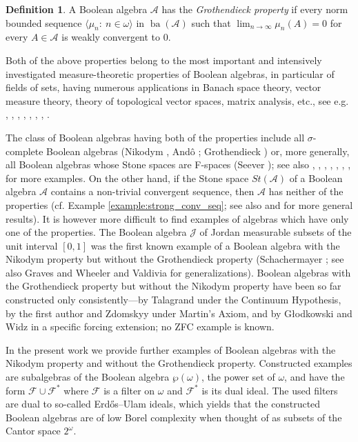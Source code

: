 \documentclass[a4paper,11pt,fleqn]{amsart}
\theoremstyle{definition}
\newtheorem{definition}[theorem]{Definition}
\theoremstyle{remark}
\numberwithin{equation}{section}
\newcommand{\frakc}{\mathfrak{c}}
\newcommand{\N}{\mathbb{N}}
\newcommand{\aA}{\mathcal{A}}
\newcommand{\fF}{\mathcal{F}}
\DeclareMathOperator{\ba}{ba}
\newcommand{\seqn}[1]{\big\langle#1\colon\ n\io\big\rangle}
\newcommand{\io}{\in\omega}%
\newcommand{\wo}{{\wp(\omega)}}%
\newcommand{\erdos}{{Erd\H{o}s}}
\begin{document}
\begin{definition}\label{def:grothendieck}
    A Boolean algebra $\aA$ has the \textit{Grothendieck property} if every norm bounded sequence $\seqn{\mu_n}$ in $\ba(\aA)$ such that $\lim_{n\to\infty}\mu_n(A)=0$ for every $A\in\aA$ is weakly convergent to $0$.
\end{definition}

Both of the above properties belong to the most important and intensively investigated measure-theoretic properties of Boolean algebras, in particular of fields of sets, having numerous applications in Banach space theory, vector measure theory, theory of topological vector spaces, matrix analysis, etc., see e.g. \cite{AS85}, \cite{BS24},  \cite{Die84}, \cite{DU77}, \cite{DS58}, \cite{FSR04}, \cite{GK21}, \cite{Sch82}.

The class of Boolean algebras having both of the properties include all $\sigma$-complete Boolean algebras (Nikodym \cite{Nik33b}, And\^{o} \cite{And61}; Grothendieck \cite{Gro53}) or, more generally, all Boolean algebras whose Stone spaces are F-spaces (Seever \cite{See68}); see also \cite{Aiz88}, \cite{Aiz92}, \cite{Das81}, \cite{DFH76}, \cite{Fre84_vhs}, \cite{Hay81}, \cite{Mol81}, \cite{SZ19} for more examples. On the other hand, if the Stone space $St(\aA)$ of a Boolean algebra $\aA$ contains a non-trivial convergent sequence, then $\aA$ has neither of the properties (cf. Example \ref{example:strong_conv_seq}; see also \cite{MS24} and \cite{Zuc25} for more general results). It is however more difficult to find examples of algebras which have only one of the properties. The Boolean algebra $\mathscr{J}$ of Jordan measurable subsets of the unit interval $[0,1]$ was the first known example of a Boolean algebra with the Nikodym property but without the Grothendieck property (Schachermayer \cite{Sch82}; see also Graves and Wheeler \cite{GW83} and Valdivia \cite{Val13} for generalizations). Boolean algebras with the Grothendieck property but without the Nikodym property have been so far constructed only consistently---by Talagrand \cite{Tal84} under the Continuum Hypothesis, by the first author and Zdomskyy \cite{SZ23} under Martin's Axiom, and by G\l odkowski and Widz \cite{GW25} in a specific forcing extension; no \textsf{ZFC} example is known.

In the present work we provide further examples of Boolean algebras with the Nikodym property and without the Grothendieck property. Constructed examples are subalgebras of the Boolean algebra $\wo$, the power set of $\omega$, and have the form $\fF\cup\fF^*$ where $\fF$ is a filter on $\omega$ and $\fF^*$ is its dual ideal. The used filters are dual to so-called \erdos--Ulam ideals, which yields that the constructed Boolean algebras are of low Borel complexity when thought of as subsets of the Cantor space $2^\omega$. %
\end{document}

